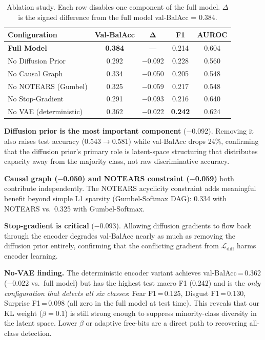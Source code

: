 \documentclass[conference]{IEEEtran}
\begin{document}
\begin{table}[htbp]
\caption{Ablation study.  Each row disables one component of the full model.
$\Delta$ is the signed difference from the full model val-BalAcc = 0.384.}
\label{tab:ablation}
\begin{center}
\setlength{\tabcolsep}{4pt}
\begin{tabular}{@{}lcccc@{}}
\toprule
\textbf{Configuration} & \textbf{Val-BalAcc} & $\boldsymbol{\Delta}$ & \textbf{F1} & \textbf{AUROC} \\
\midrule
\textbf{Full Model}      & \textbf{0.384} & ---    & 0.214 & 0.604 \\
\midrule
No Diffusion Prior       & 0.292 & $-$0.092 & 0.228 & 0.560 \\
No Causal Graph          & 0.334 & $-$0.050 & 0.205 & 0.548 \\
No NOTEARS (Gumbel)      & 0.325 & $-$0.059 & 0.217 & 0.548 \\
No Stop-Gradient         & 0.291 & $-$0.093 & 0.216 & 0.640 \\
No VAE (deterministic)   & 0.362 & $-$0.022 & \textbf{0.242} & 0.624 \\
\bottomrule
\end{tabular}
\end{center}
\end{table}

\textbf{Diffusion prior is the most important component} ($-$0.092).  Removing
it also raises test accuracy (0.543$\to$0.581) while val-BalAcc drops 24\%,
confirming that the diffusion prior's primary role is latent-space structuring
that distributes capacity away from the majority class, not raw discriminative
accuracy.

\textbf{Causal graph ($-$0.050) and NOTEARS constraint ($-$0.059)} both
contribute independently.  The NOTEARS acyclicity constraint adds meaningful
benefit beyond simple L1 sparsity (Gumbel-Softmax DAG): 0.334 with NOTEARS
vs.\ 0.325 with Gumbel-Softmax.

\textbf{Stop-gradient is critical} ($-$0.093).  Allowing diffusion gradients
to flow back through the encoder degrades val-BalAcc nearly as much as removing
the diffusion prior entirely, confirming that the conflicting gradient from
$\mathcal{L}_{\mathrm{diff}}$ harms encoder learning.

\textbf{No-VAE finding.}  The deterministic encoder variant achieves
val-BalAcc\,=\,0.362 ($-$0.022 vs.\ full model) but has the highest test macro
F1 (0.242) and is the \emph{only configuration that detects all six classes}:
Fear F1\,=\,0.125, Disgust F1\,=\,0.130, Surprise F1\,=\,0.098 (all zero in
the full model at test time).  This reveals that our KL weight ($\beta=0.1$)
is still strong enough to suppress minority-class diversity in the latent space.
Lower $\beta$ or adaptive free-bits are a direct path to recovering all-class
detection.
\end{document}
